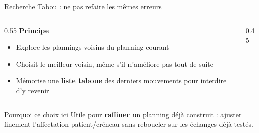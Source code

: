 \documentclass[aspectratio=169,11pt]{beamer}
\begin{document}
\begin{frame}{Recherche Tabou : ne pas refaire les mêmes erreurs}
  \begin{columns}
    \begin{column}{0.55\textwidth}
      \textbf{Principe}
      \begin{itemize}
        \item Explore les plannings voisins du planning courant
        \item Choisit le meilleur voisin, même s'il n'améliore pas tout de suite
        \item Mémorise une \textbf{liste taboue} des derniers mouvements pour
        interdire d'y revenir
      \end{itemize}
    \end{column}
    \begin{column}{0.45\textwidth}
      \centering
    \end{column}
  \end{columns}
  \begin{block}{Pourquoi ce choix ici}
    Utile pour \textbf{raffiner} un planning déjà construit : ajuster finement
    l'affectation patient/créneau sans reboucler sur les échanges déjà testés.
  \end{block}
\end{frame}
\end{document}

